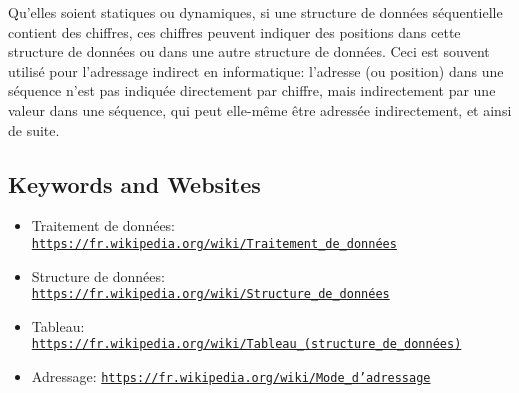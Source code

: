 \documentclass[a4paper,11pt]{report}
\newcommand{\BrochureUrlText}[1]{\texttt{#1}}
\begin{document}
Qu’elles soient statiques ou dynamiques, si une structure de données séquentielle contient des chiffres, ces chiffres peuvent indiquer des positions dans cette structure de données ou dans une autre structure de données. Ceci est souvent utilisé pour l’adressage indirect en informatique: l’adresse (ou position) dans une séquence n’est pas indiquée directement par chiffre, mais indirectement par une valeur dans une séquence, qui peut elle-même être adressée indirectement, et ainsi de suite.

{\raggedright

\subsection*{Keywords and Websites}

\begin{itemize}
  \item Traitement de données: \href{https://fr.wikipedia.org/wiki/Traitement_de_donn\%C3\%A9es}{\BrochureUrlText{https://fr.wikipedia.org/wiki/Traitement\_de\_données}}
  \item Structure de données: \href{https://fr.wikipedia.org/wiki/Structure_de_donn\%C3\%A9es}{\BrochureUrlText{https://fr.wikipedia.org/wiki/Structure\_de\_données}}
  \item Tableau: \href{https://fr.wikipedia.org/wiki/Tableau_(structure_de_donn\%C3\%A9es)}{\BrochureUrlText{https://fr.wikipedia.org/wiki/Tableau\_(structure\_de\_données)}}
  \item Adressage: \href{https://fr.wikipedia.org/wiki/Mode_d\%27adressage}{\BrochureUrlText{https://fr.wikipedia.org/wiki/Mode\_d'adressage}}
\end{itemize}


}
\end{document}
